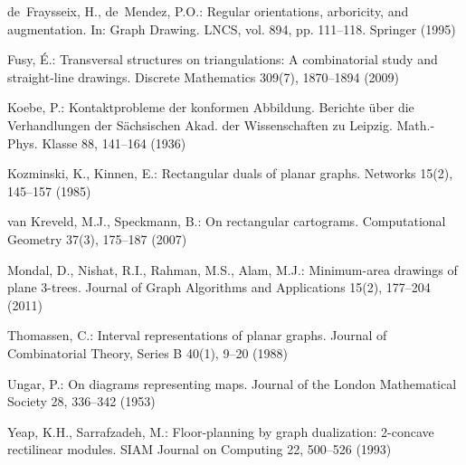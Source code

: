 \documentclass{llncs}
\begin{document}
{\begin{small}
\begin{thebibliography}{10}
de~Fraysseix, H., de~Mendez, P.O.: Regular orientations, arboricity, and
  augmentation. In: Graph Drawing. LNCS, vol. 894, pp. 111--118. Springer
  (1995)

Fusy, {\'E}.: Transversal structures on triangulations: A combinatorial study
  and straight-line drawings. Discrete Mathematics  309(7),  1870--1894 (2009)

Koebe, P.: {K}ontaktprobleme der konformen {A}bbildung. Berichte {\"u}ber die
  Verhandlungen der S{\"a}chsischen Akad. der Wissenschaften zu Leipzig.
  Math.-Phys. Klasse  88,  141--164 (1936)

Kozminski, K., Kinnen, E.: Rectangular duals of planar graphs. Networks  15(2),
   145--157 (1985)

van Kreveld, M.J., Speckmann, B.: On rectangular cartograms. Computational
  Geometry  37(3),  175--187 (2007)

Mondal, D., Nishat, R.I., Rahman, M.S., Alam, M.J.: Minimum-area drawings of
  plane 3-trees. Journal of Graph Algorithms and Applications  15(2),  177--204
  (2011)

Thomassen, C.: Interval representations of planar graphs. Journal of
  Combinatorial Theory, Series B  40(1),  9--20 (1988)

Ungar, P.: On diagrams representing maps. Journal of the London Mathematical
  Society  28,  336--342 (1953)

Yeap, K.H., Sarrafzadeh, M.: Floor-planning by graph dualization: 2-concave
  rectilinear modules. SIAM Journal on Computing  22,  500--526 (1993)

\end{thebibliography}
 \end{small}
}
\end{document}
